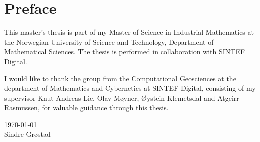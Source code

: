 {}
\chapter*{Preface}
This master's thesis is part of my Master of Science in Industrial Mathematics at the Norwegian University of Science and Technology, Department of Mathematical Sciences. The thesis is performed in collaboration with SINTEF Digital. 

I would like to thank the group from the Computational Geosciences at the department of Mathematics and Cybernetics at SINTEF Digital, consisting of my supervisor Knut-Andreas Lie, Olav Møyner, Øystein Klemetsdal and Atgeirr Rasmussen, for valuable guidance through this thesis.

\today \\
Sindre Grøstad